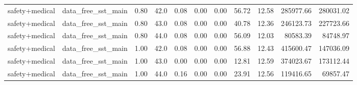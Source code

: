 \documentclass{article}
\begin{document}
\begin{table}[H]
{\begin{tabular}{llllrrrrrrr}
safety+medical & data\_free\_sst\_main & 0.80 & 42.0 & 0.08 & 0.00 & 0.00 & 56.72 & 12.58 & 285977.66 & 280031.02 \\
safety+medical & data\_free\_sst\_main & 0.80 & 43.0 & 0.08 & 0.00 & 0.00 & 40.78 & 12.36 & 246123.73 & 227723.66 \\
safety+medical & data\_free\_sst\_main & 0.80 & 44.0 & 0.08 & 0.00 & 0.00 & 56.09 & 12.03 & 80583.39 & 84748.97 \\
safety+medical & data\_free\_sst\_main & 1.00 & 42.0 & 0.08 & 0.00 & 0.00 & 56.88 & 12.43 & 415600.47 & 147036.09 \\
safety+medical & data\_free\_sst\_main & 1.00 & 43.0 & 0.00 & 0.00 & 0.00 & 12.81 & 12.59 & 374023.67 & 173112.44 \\
safety+medical & data\_free\_sst\_main & 1.00 & 44.0 & 0.16 & 0.00 & 0.00 & 23.91 & 12.56 & 119416.65 & 69857.47 \\
\bottomrule
\end{tabular}
}
\end{table}
\end{document}
